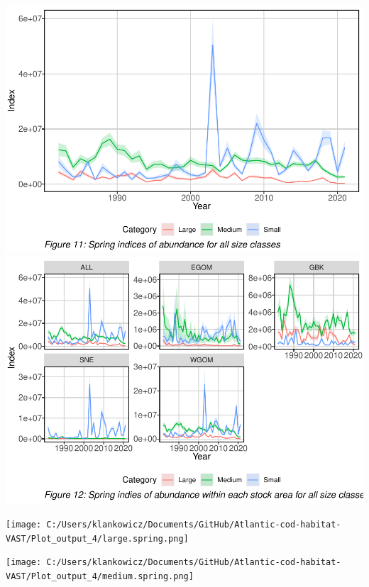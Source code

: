 \documentclass[
]{article}
\let\origfigure\figure
\let\endorigfigure\endfigure
\renewenvironment{figure}[1][2] {
    \expandafter\origfigure\expandafter[H]
} {
    \endorigfigure
}
\begin{document}
\includegraphics{ToR1_TechPaper_files/figure-latex/spring index-1.pdf} \includegraphics{ToR1_TechPaper_files/figure-latex/spring index-2.pdf}

\begin{figure}
\centering
\texttt{[image: C:/Users/klankowicz/Documents/GitHub/Atlantic-cod-habitat-VAST/Plot\_output\_4/large.spring.png]}
\caption{Figure 13: Large cod center of gravity and effective area occupied for all stock areas, spring seasons 1982 - 2021.}
\end{figure}

\begin{figure}
\centering
\texttt{[image: C:/Users/klankowicz/Documents/GitHub/Atlantic-cod-habitat-VAST/Plot\_output\_4/medium.spring.png]}
\caption{Figure 14: Medium cod center of gravity and effective area occupied for all stock areas, spring seasons 1982 - 2021.}
\end{figure}
\end{document}
